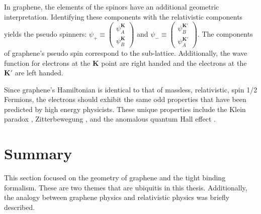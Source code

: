 In graphene, the elements of the spinors have an additional geometric interpretation.
Identifying these components with the relativistic components yields the pseudo spinners: $\psi_+ \equiv \left(\begin{array}{c} \psi_A^{\bm{K}} \\ \psi_B^{\bm{K}} \end{array} \right)$ and $\psi_- \equiv \left(\begin{array}{c} \psi_B^{\bm{K'}} \\ \psi_A^{\bm{K'}} \end{array} \right)$.
The components of graphene's pseudo spin correspond to the sub-lattice.
Additionally, the wave function for electrons at the $\bm{K}$ point are right handed and the electrons at the $\bm{K'}$ are left handed.

Since graphene's Hamiltonian is identical to that of massless, relativistic, spin 1/2 Fermions, the electrons should exhibit the same odd properties that have been predicted by high energy physicists.
These unique properties include the Klein paradox \cite{Young2009}, Zitterbewegung \cite{CastroNeto2009}, and the anomalous quantum Hall effect \cite{Novoselov2005a,Zhang2005}.

\section{Summary}
This section focused on the geometry of graphene and the tight binding formalism.
These are two themes that are ubiquitis in this thesis.
Additionally, the analogy between graphene physics and relativistic physics was briefly described.